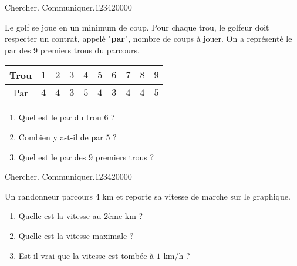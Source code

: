 \begin{pageParcoursu} 

 
\begin{ExoCu}{Chercher. Communiquer.}{1234}{2}{0}{0}{0}{0}

Le golf se joue en un minimum de coup. Pour chaque trou, le golfeur doit respecter un contrat, appelé "\textbf{par}", nombre de coups à jouer. On a représenté le par des 9 premiers trous du parcours. 

 \begin{center}
 \begin{tabular}{|c|c|c|c|c|c|c|c|c|c|} \hline
  Trou  & $1$ & $2$ & $3$ &  $4$ & $5$ & $6$  &  $7$ & $8$ & $9$ \\  \hline
  Par & $4$ & $4$ &$3$ & $5$ & $4$ &  $3$ & $4$ &$4$ & $5$   \\\hline
 \end{tabular}
 \end{center}
 
\begin{enumerate}[leftmargin=*] 
 \item Quel est le par du trou $6$ ? 
 \item Combien y a-t-il de par $5$ ? 
 \item Quel est le par des $9$ premiers trous ? 
\end{enumerate} 
 
\end{ExoCu}

\begin{ExoCu}{Chercher. Communiquer.}{1234}{2}{0}{0}{0}{0}

Un randonneur parcours 4 km et reporte sa vitesse de marche sur le graphique.

\begin{minipage}{0.38\linewidth}
\begin{center}
\end{center}
\end{minipage}
\begin{minipage}{0.58\linewidth}
 \begin{enumerate}
 	\item Quelle est la vitesse au 2ème km ? 
 	\item Quelle est la vitesse maximale ? 
 	\item Est-il vrai que la vitesse est tombée à $1$ km/h ?
 \end{enumerate}
\end{minipage} 
 

\end{ExoCu}
\end{pageParcoursu}
